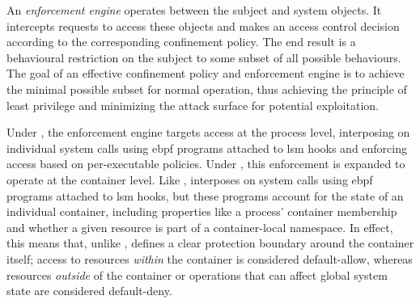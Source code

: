 An \textit{enforcement engine} operates between the subject and system objects. It
intercepts requests to access these objects and makes an access control decision according
to the corresponding confinement policy. The end result is a behavioural restriction on
the subject to some subset of all possible behaviours. The goal of an effective
confinement policy and enforcement engine is to achieve the minimal possible subset for
normal operation, thus achieving the principle of least privilege and minimizing the
attack surface for potential exploitation.

Under \bpfbox{}, the enforcement engine targets access at the process level, interposing
on individual system calls using \gls{ebpf} programs attached to \gls{lsm} hooks and
enforcing access based on per-executable policies. Under \bpfcontain{}, this enforcement
is expanded to operate at the container level. Like \bpfbox{}, \bpfcontain{} interposes on
system calls using \gls{ebpf} programs attached to \gls{lsm} hooks, but these programs
account for the state of an individual container, including properties like a process'
container membership and whether a given resource is part of a container-local namespace.
In effect, this means that, unlike \bpfbox{}, \bpfcontain{} defines a clear protection
boundary around the container itself; access to resources \textit{within} the container is
considered default-allow, whereas resources \textit{outside}  of the container or
operations that can affect global system state are considered default-deny.



